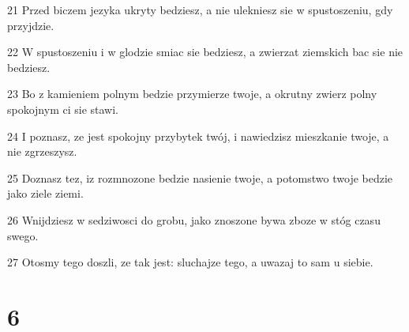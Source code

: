 \par 21 Przed biczem jezyka ukryty bedziesz, a nie ulekniesz sie w spustoszeniu, gdy przyjdzie.
\par 22 W spustoszeniu i w glodzie smiac sie bedziesz, a zwierzat ziemskich bac sie nie bedziesz.
\par 23 Bo z kamieniem polnym bedzie przymierze twoje, a okrutny zwierz polny spokojnym ci sie stawi.
\par 24 I poznasz, ze jest spokojny przybytek twój, i nawiedzisz mieszkanie twoje, a nie zgrzeszysz.
\par 25 Doznasz tez, iz rozmnozone bedzie nasienie twoje, a potomstwo twoje bedzie jako ziele ziemi.
\par 26 Wnijdziesz w sedziwosci do grobu, jako znoszone bywa zboze w stóg czasu swego.
\par 27 Otosmy tego doszli, ze tak jest: sluchajze tego, a uwazaj to sam u siebie.

\chapter{6}


